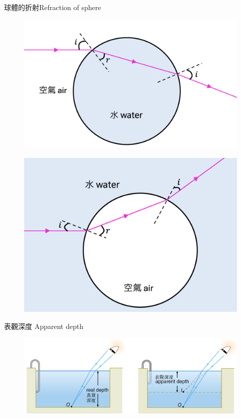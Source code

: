 \documentclass[beamer=true]{standalone}
\begin{document}

\begin{frame}{球體的折射Refraction of sphere}
    \begin{figure}
        \centering
        \includegraphics[width=0.45\linewidth]{assets/2980192839123.png}
        
    \end{figure}

    \begin{figure}
        \centering
        \includegraphics[width=0.45\linewidth]{assets/e12080481291d.png}
    \end{figure}
\end{frame}




\begin{frame}{表觀深度 Apparent depth}
    \begin{figure}
        \centering
        \includegraphics[width=0.9\linewidth]{assets/djoqwidjqwid213131.png}
    \end{figure}
\end{frame}
\end{document}
